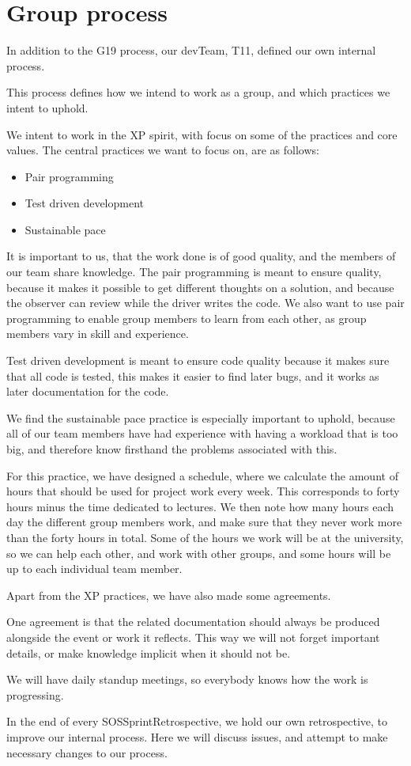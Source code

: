 \section{Group process}

In addition to the \gls{G19} process, our \gls{devTeam}, \gls{T11}, defined our own internal process.

This process defines how we intend to work as a group, and which practices we intent to uphold.

We intent to work in the \gls{XP} spirit, with focus on some of the practices and core values.
The central practices we want to focus on, are as follows:
\begin{itemize}
    \item Pair programming 
    \item Test driven development
    \item Sustainable pace
\end{itemize}

It is important to us, that the work done is of good quality, and the members of our team share knowledge. The pair programming is meant to ensure quality, because it makes it possible to get different thoughts on a solution, and because the observer can review while the \gls{driver} writes the code. We also want to use pair programming to enable group members to learn from each other, as group members vary in skill and experience.

Test driven development is meant to ensure code quality because it makes sure that all code is tested, this makes it easier to find later bugs, and it works as later documentation for the code.

We find the sustainable pace practice is especially important to uphold, because all of our team members have had experience with having a workload that is too big, and therefore know firsthand the problems associated with this.

For this practice, we have designed a schedule, where we calculate the amount of hours that should be used for project work every week. This corresponds to forty hours minus the time dedicated to lectures. We then note how many hours each day the different group members work, and make sure that they never work more than the forty hours in total. Some of the hours we work will be at the university, so we can help each other, and work with other groups, and some hours will be up to each individual team member.

Apart from the \gls{XP} practices, we have also made some agreements.

One agreement is that the related documentation should always be produced alongside the event or work it reflects. This way we will not forget important details, or make knowledge implicit when it should not be.

We will have daily standup meetings, so everybody knows how the work is progressing.

In the end of every \gls{SOSSprintRetrospective}, we hold our own retrospective, to improve our internal process. Here we will discuss issues, and attempt to make necessary changes to our process.
